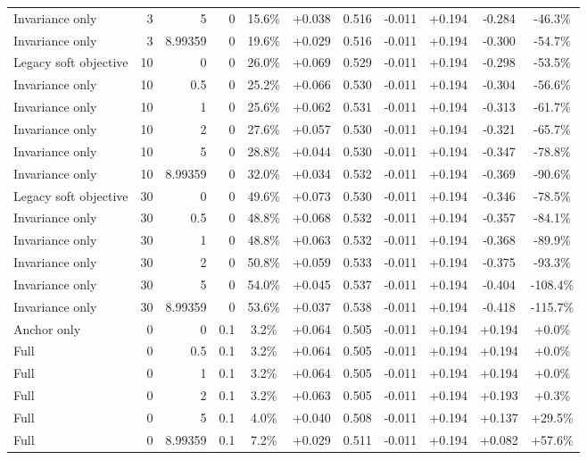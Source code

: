 \begin{table}[htbp]
\begin{tabular}{lrrrccccccc}
Invariance only & 3 & 5 & 0 & 15.6\% & +0.038 & 0.516 & -0.011 & +0.194 & -0.284 & -46.3\% \\
Invariance only & 3 & 8.99359 & 0 & 19.6\% & +0.029 & 0.516 & -0.011 & +0.194 & -0.300 & -54.7\% \\
Legacy soft objective & 10 & 0 & 0 & 26.0\% & +0.069 & 0.529 & -0.011 & +0.194 & -0.298 & -53.5\% \\
Invariance only & 10 & 0.5 & 0 & 25.2\% & +0.066 & 0.530 & -0.011 & +0.194 & -0.304 & -56.6\% \\
Invariance only & 10 & 1 & 0 & 25.6\% & +0.062 & 0.531 & -0.011 & +0.194 & -0.313 & -61.7\% \\
Invariance only & 10 & 2 & 0 & 27.6\% & +0.057 & 0.530 & -0.011 & +0.194 & -0.321 & -65.7\% \\
Invariance only & 10 & 5 & 0 & 28.8\% & +0.044 & 0.530 & -0.011 & +0.194 & -0.347 & -78.8\% \\
Invariance only & 10 & 8.99359 & 0 & 32.0\% & +0.034 & 0.532 & -0.011 & +0.194 & -0.369 & -90.6\% \\
Legacy soft objective & 30 & 0 & 0 & 49.6\% & +0.073 & 0.530 & -0.011 & +0.194 & -0.346 & -78.5\% \\
Invariance only & 30 & 0.5 & 0 & 48.8\% & +0.068 & 0.532 & -0.011 & +0.194 & -0.357 & -84.1\% \\
Invariance only & 30 & 1 & 0 & 48.8\% & +0.063 & 0.532 & -0.011 & +0.194 & -0.368 & -89.9\% \\
Invariance only & 30 & 2 & 0 & 50.8\% & +0.059 & 0.533 & -0.011 & +0.194 & -0.375 & -93.3\% \\
Invariance only & 30 & 5 & 0 & 54.0\% & +0.045 & 0.537 & -0.011 & +0.194 & -0.404 & -108.4\% \\
Invariance only & 30 & 8.99359 & 0 & 53.6\% & +0.037 & 0.538 & -0.011 & +0.194 & -0.418 & -115.7\% \\
Anchor only & 0 & 0 & 0.1 & 3.2\% & +0.064 & 0.505 & -0.011 & +0.194 & +0.194 & +0.0\% \\
Full & 0 & 0.5 & 0.1 & 3.2\% & +0.064 & 0.505 & -0.011 & +0.194 & +0.194 & +0.0\% \\
Full & 0 & 1 & 0.1 & 3.2\% & +0.064 & 0.505 & -0.011 & +0.194 & +0.194 & +0.0\% \\
Full & 0 & 2 & 0.1 & 3.2\% & +0.063 & 0.505 & -0.011 & +0.194 & +0.193 & +0.3\% \\
Full & 0 & 5 & 0.1 & 4.0\% & +0.040 & 0.508 & -0.011 & +0.194 & +0.137 & +29.5\% \\
Full & 0 & 8.99359 & 0.1 & 7.2\% & +0.029 & 0.511 & -0.011 & +0.194 & +0.082 & +57.6\% \\

\end{tabular}
\end{table}
